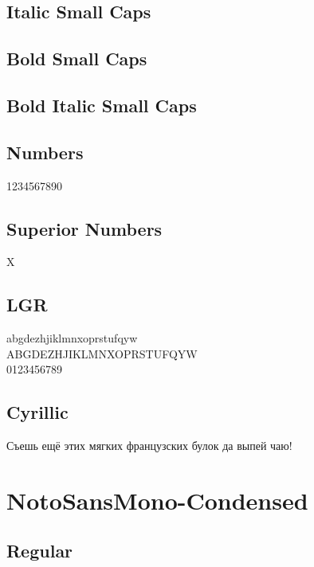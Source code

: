 \documentclass{article}
\begin{document}
\subsection*{Italic Small Caps}
\textsc{\textit{\lipsum[2]}}

\subsection*{Bold Small Caps}

\textsc{\textbf{\lipsum[3]}}



\subsection*{Bold Italic Small Caps}
\textsc{\textbf{\textit{\lipsum[4]}}}

\subsection*{Numbers}

1234567890

\subsection*{Superior Numbers}

X


\subsection*{LGR}

{\notosanscondensedlgr\noindent
abgdezhjiklmnxoprstufqyw\\
ABGDEZHJIKLMNXOPRSTUFQYW\\
0123456789
}

\subsection*{Cyrillic}

{\ifxetex\else\ifluatex\else{}\selectfont\fi\fi
Съешь ещё этих мягких французских булок да
выпей чаю!}

\section*{NotoSansMono-Condensed}

\ttfamily

\subsection*{Regular}
\lipsum[1]
\end{document}
